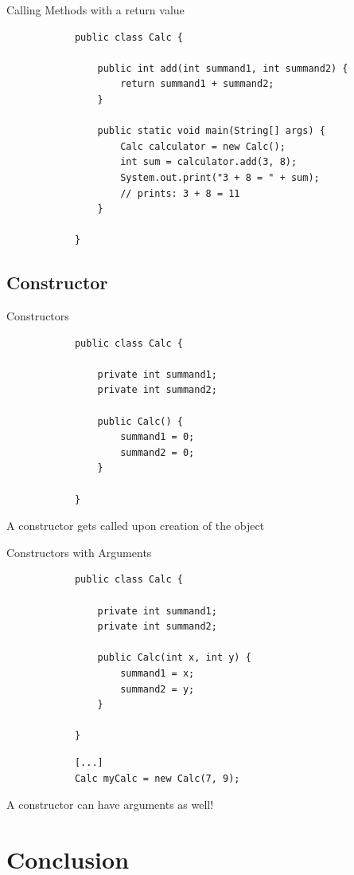	\begin{frame}[fragile]{Calling Methods with a return value}
		\begin{lstlisting}
			public class Calc {
				
				public int add(int summand1, int summand2) {
					return summand1 + summand2;
				}
				
				public static void main(String[] args) {
					Calc calculator = new Calc();
					int sum = calculator.add(3, 8);
					System.out.print("3 + 8 = " + sum); 
					// prints: 3 + 8 = 11
				}
				
			}
		\end{lstlisting}
	\end{frame}
	
	\subsection{Constructor}
	
	\begin{frame}[fragile]{Constructors}
		\begin{lstlisting}
			public class Calc {
				
				private int summand1;
				private int summand2;
				
				public Calc() {
					summand1 = 0;
					summand2 = 0;
				}
				
			}
		\end{lstlisting}
		A constructor gets called upon creation of the object
	\end{frame}
	
	\begin{frame}[fragile]{Constructors with Arguments}
		\begin{lstlisting}
			public class Calc {
				
				private int summand1;
				private int summand2;
				
				public Calc(int x, int y) {
					summand1 = x;
					summand2 = y;
				}
				
			}
		\end{lstlisting}
		\begin{lstlisting}
			[...]
			Calc myCalc = new Calc(7, 9);
		\end{lstlisting}
		
		A constructor can have arguments as well!
	\end{frame}
	
	\section{Conclusion}
